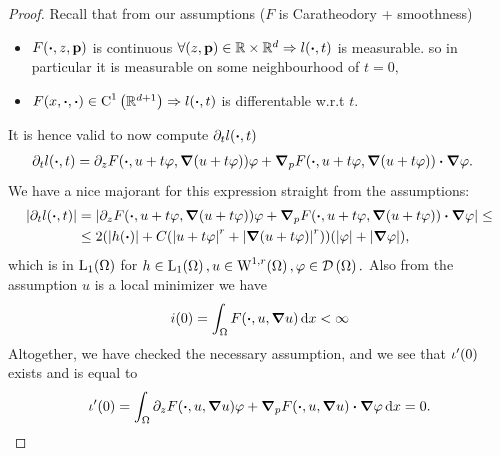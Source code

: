 \documentclass{article}
\begin{document}
\begin{proof}
	Recall that from our assumptions ($F$ is Caratheodory + smoothness)
	\begin{itemize}
		\item $F\qty(\vdot, z, \vb{p})$ is continuous $\forall (z, \vb{p}) \in \R \times \R^{d} \Rightarrow l(\vdot, t)$ is measurable. so in particular it is measurable on some neighbourhood of $t = 0,$ 
		\item $F(x, \vdot, \vdot) \in \CkSet{1}{\R^{d+1}} \Rightarrow l\qty(\vdot, t)$ is differentable w.r.t $t$.
	\end{itemize}
	It is hence valid to now compute $\partial_{t} l\qty(\vdot, t)$  
	\begin{align*}
		\partial_t l(\vdot, t) &= \partial_{z}F\qty(\vdot, u+t \varphi, \grad \qty(u+t \varphi))\varphi + \grad_p F\qty(\vdot, u+t \varphi, \grad\qty(u+t \varphi))\vdot \grad \varphi.
	\end{align*}
	We have a nice majorant for this expression straight from the assumptions:
	\begin{align*}
		\abs{\partial_t l(\vdot, t)} &=\abs{\partial_{z}F\qty(\vdot, u+t \varphi, \grad \qty(u+t \varphi))\varphi + \grad_p F\qty(\vdot, u+t \varphi, \grad\qty(u+t \varphi))\vdot \grad \varphi} \leq \\
					     &\leq 2\qty(\abs{h(\vdot)} + C\qty(\abs{u + t \varphi}^r + \abs{\grad (u + t \varphi)}^r))\qty(\abs{\varphi} + \abs{\grad \varphi}),
	\end{align*}
	which is in $\LpSet[1]{\Omega}$ for $h \in \LpSet[1]{\Omega}, u \in \WkpSet[1][r]{\Omega}, \varphi \in \DSet{\Omega}.$ Also from the assumption $u$ is a local minimizer we have
	\[
		i(0) = \int_{\Omega}F\qty(\vdot, u, \grad u)\dd{x} < \infty
	\]
	Altogether, we have checked the necessary assumption, and we see that $\iota'\qty(0)$ exists and is equal to
	\[
		\iota'\qty(0) = \int_{\Omega}\partial_{z}F\qty(\vdot, u, \grad u)\varphi + \grad_p F\qty(\vdot, u, \grad u) \vdot \grad \varphi\dd{x} =0.
	\]
\end{proof}
\end{document}
